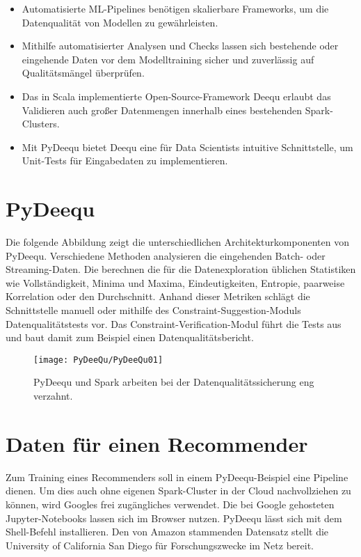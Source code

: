 \begin{itemize}
  \item Automatisierte ML-Pipelines benötigen skalierbare Frameworks, um die Datenqualität von Modellen zu gewährleisten.
  \item Mithilfe automatisierter Analysen und Checks lassen sich bestehende oder eingehende Daten vor dem Modelltraining sicher und zuverlässig auf Qualitätsmängel überprüfen.
  \item Das in Scala implementierte Open-Source-Framework Deequ erlaubt das Validieren auch großer Datenmengen innerhalb eines bestehenden Spark-Clusters.
  \item Mit PyDeequ bietet Deequ eine für Data Scientists intuitive Schnittstelle, um Unit-Tests für Eingabedaten zu implementieren.
\end{itemize}

\section{PyDeequ}

Die folgende Abbildung zeigt die unterschiedlichen Architekturkomponenten von PyDeequ. Verschiedene Methoden analysieren die eingehenden Batch- oder Streaming-Daten. Die  berechnen die für die Datenexploration üblichen Statistiken wie Vollständigkeit, Minima und Maxima, Eindeutigkeiten, Entropie, paarweise Korrelation oder den Durchschnitt. Anhand dieser Metriken schlägt die Schnittstelle manuell oder mithilfe des Constraint-Suggestion-Moduls Datenqualitätstests vor. Das Constraint-Verification-Modul führt die Tests aus und baut damit zum Beispiel einen Datenqualitätsbericht.

\begin{figure}
  \texttt{[image: PyDeeQu/PyDeeQu01]}
  \caption[PyDeequ und Spark]{PyDeequ und Spark arbeiten bei der Datenqualitätssicherung eng verzahnt.}\label{PyDeeQu01}
\end{figure}


\section{Daten für einen Recommender}

Zum Training eines Recommenders soll in einem PyDeequ-Beispiel eine Pipeline dienen. Um dies auch ohne eigenen Spark-Cluster in der Cloud nachvollziehen zu können, wird Googles frei zugängliches  verwendet. Die bei Google gehosteten Jupyter-Notebooks lassen sich im Browser nutzen.  PyDeequ lässt sich mit dem Shell-Befehl  installieren. Den von Amazon stammenden Datensatz stellt die University of California San Diego für Forschungszwecke im Netz bereit.

